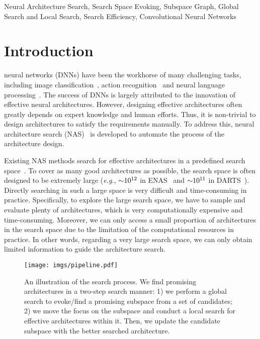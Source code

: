 \documentclass[lettersize,journal]{IEEEtran}
\def\eg{\emph{e.g.}} \def\Eg{\emph{E.g.}}
\begin{document}
\begin{IEEEkeywords}
Neural Architecture Search, Search Space Evoking, Subspace Graph, Global Search and Local Search, Search Efficiency, Convolutional Neural Networks
\end{IEEEkeywords}

\section{Introduction}
 neural networks (DNNs) have been the workhorse of many challenging tasks, including image classification~\cite{resnet,alexey2021vit,liu2021Swin,liu2021swinv2}, action recognition~\cite{duan2020omni,feichtenhofer2019slowfast,tu2019action,liu2022apsnet} and neural language processing~\cite{radford2018improving,brown2020language}.
The success of DNNs is largely attributed to the innovation of effective neural architectures.
However, designing effective architectures often greatly depends on expert knowledge and human efforts.
Thus, it is non-trivial to design architectures to satisfy the requirements manually.
To address this, neural architecture search (NAS)~\cite{zoph2016neural} is developed to automate the process of the architecture design.

Existing NAS methods search for effective architectures in a predefined search space~\cite{zoph2016neural,liu2018darts,tan2019mnasnet}.
To cover as many good architectures as possible, the search space is often designed to be extremely large (\eg, $\small{\sim}10^{12}$ in ENAS~\cite{pham2018efficient} and $\small{\sim}10^{11}$ in DARTS~\cite{liu2018darts}).
Directly searching in such a large space is very difficult and time-consuming in practice.
Specifically, to explore the large search space, we have to sample and evaluate plenty of architectures, which is very computationally expensive and time-consuming.
Moreover, we can only access a small proportion of architectures in the search space due to the limitation of the computational resources in practice.
In other words, regarding a very large search space, we can only obtain limited information to guide the architecture search.


\begin{figure*}[t]
\centering
\texttt{[image: imgs/pipeline.pdf]}
\caption{An illustration of the search process.
We find promising architectures in a two-step search manner:
1) we perform a global search to evoke/find a promising subspace from a set of candidates;
2) we move the focus on the subspace and conduct a local search for effective architectures within it.
Then, we update the candidate subspace with the better searched architecture.
}
\label{fig:graph_space}
\end{figure*}
\end{document}
